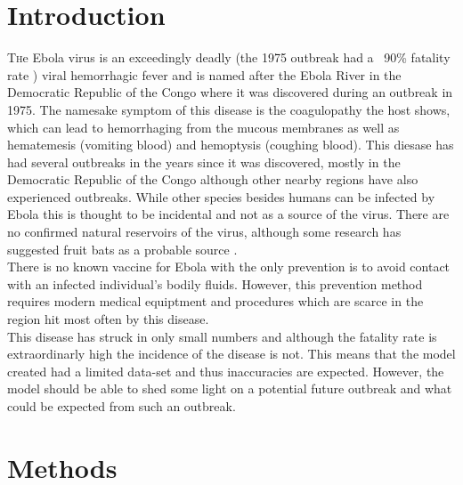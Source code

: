 \documentclass[twoside]{article}
\begin{document}
\begin{multicols}{2} %

\section{Introduction}

\lettrine[nindent=0em,lines=3]{T} he Ebola virus is an exceedingly deadly (the 1975 outbreak
	had a ~90\% fatality rate \cite{World Health Organization}) viral hemorrhagic fever and is named after the Ebola River 
	in the Democratic Republic of the Congo where it was discovered during an outbreak in 1975.
	The namesake symptom of this disease is the coagulopathy the host shows, which can lead to
	hemorrhaging from the mucous membranes as well as hematemesis (vomiting blood) and
	hemoptysis (coughing blood). This diesase has had several outbreaks in the years since it
	was discovered, mostly in the Democratic Republic of the Congo although other nearby regions have also experienced
	outbreaks. While other species besides humans can be infected by Ebola this is thought to be incidental and not as a 
	source of the virus. There are no confirmed natural reservoirs of the virus, although some research has suggested fruit 
	bats as a probable source \cite{World Health Organization}.\\

	There is no known vaccine for Ebola with the only prevention is to avoid contact with an
	infected individual's bodily fluids. However, this prevention method requires modern medical
	equiptment and procedures which are scarce in the region hit most often by this disease. \\

	This disease has struck in only small numbers and although the fatality rate is extraordinarly 
	high the incidence of the disease is not. This means that the model created had a limited data-set
	and thus inaccuracies are expected. However, the model should be able to shed some light on
	a potential future outbreak and what could be expected from such an outbreak.


\section{Methods}


\end{multicols}
\end{document}

